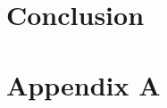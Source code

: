 \documentclass[11pt]{diazessay} %
\begin{document}

\section*{Conclusion}


\clearpage
%



\section*{Appendix A}


\end{document}
